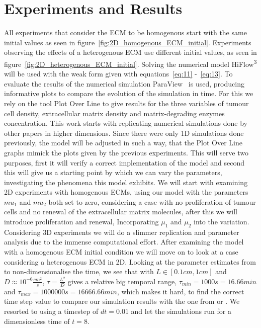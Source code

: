 

\section{Experiments and Results}

All experiments that consider the ECM to be homogenous start with the same initial values as seen in figure~\ref{fig:2D_homogenous_ECM_initial}. Experiments observing the effects of a heterogenous ECM use different initial values, as seen in figure~\ref{fig:2D_heterogenous_ECM_initial}.\newline 
Solving the numerical model HiFlow\textsuperscript{3} will be used with the weak form given with equations~\ref{eq:11} -~\ref{eq:13}. To evaluate the results of the numerical simulation ParaView~\cite{paraview} is used, producing informative plots to compare the evolution of the simulation in time. For this we rely on the tool Plot Over Line to give results for the three variables of tumour cell density, extracellular matrix density and matrix-degrading enzymes concentration.\newline
This work starts with replicating numerical simulations done by other papers in higher dimensions. Since there were only 1D simulations done previously, the model will be adjusted in such a way, that the Plot Over Line graphs mimick the plots given by the previous experiments. This will serve two purposes, first it will verify a correct implementation of the model and second this will give us a starting point by which we can vary the parameters, investigating the phenomena this model exhibits. \newline 
We will start with examining 2D experiments with homogenous ECMs, using our model with the parameters $mu_1$ and $mu_2$ both set to zero, considering a case with no proliferation of tumour cells and no renewal of the extracellular matrix molecules, after this we will introduce proliferation and renewal, Incorporating $\mu_1$ and $\mu_2$ into the variation.
Considering 3D experiments we will do a slimmer replication and parameter analysis due to the immense computational effort. After examining the model with a homogenous ECM initial condition we will move on to look at a case considering a heterogenous ECM in 2D.\newline
Looking at the parameter estimates from \cite{anderson_mathematical_2000} to non-dimensionalise the time, we see that with $L \in [0.1cm,1cm]$ and $D\approx 10^{-6}\frac{cm^2}{s}$, $\tau = \frac{L^2}{D}$ gives a relative big temporal range, $\tau_{min} = 1000s = 16.66 min$ and $\tau_{max} = 1000000s = 16666.66min$, which makes it hard, to find the correct time step value to compare our simulation results with the one from \cite{anderson_mathematical_2000} or \cite{Kolev2010}. We resorted to using a timestep of $dt=0.01$ and let the simulations run for a dimensionless time of $t=8$.\newline 
